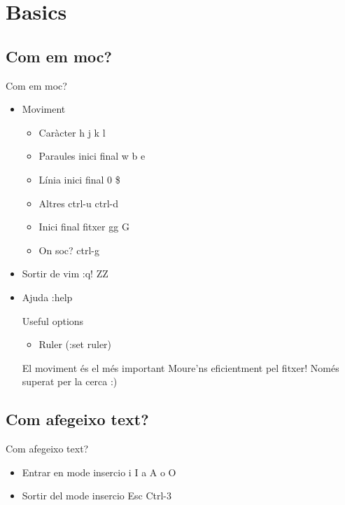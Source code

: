 \documentclass{beamer}
\begin{document}
\section{Basics}
    \subsection{Com em moc?}
    \begin{frame}{Com em moc?}
        \begin{itemize}
            \item Moviment
                \begin{itemize}
                    \item Caràcter \alert{h j k l}
                    \item Paraules inici final \alert{w b e}
                    \item Línia  inici final \alert{0 \$}
                    \item Altres \alert{ctrl-u ctrl-d }
                    \item Inici final fitxer \alert{gg G}
                    \item On soc? \alert{ctrl-g}
                \end{itemize}
            \item Sortir de vim
                \alert{:q! ZZ}
            \item Ajuda {:help}
            \begin{alertblock}{Useful options}
                \begin{itemize}
                    \item Ruler (\alert{:set ruler})
                \end{itemize}
            \end{alertblock}
            \begin{block}{El moviment és el més important}
                Moure'ns eficientment pel fitxer! Només superat per la cerca :)
            \end{block}
        \end{itemize}
    \end{frame}

    \subsection{Com afegeixo text?}
    \begin{frame}{Com afegeixo text?}
        \begin{itemize}
            \item Entrar en mode insercio \alert{i I a A o O}
            \item Sortir del mode insercio \alert{Esc Ctrl-3}
        \end{itemize}
    \end{frame}
\end{document}
